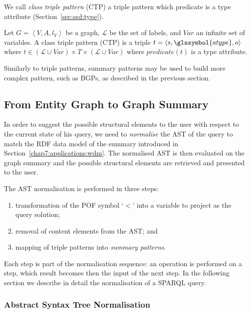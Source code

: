 We call \emph{class triple pattern} (CTP) a triple pattern which predicate is a type attribute (Section~\ref{sec:ssd:type}).

\begin{definition}
	Let $G=\left\langle V, A, l_V \right\rangle$ be a graph, $\mathcal{L}$ be the set of labels, and $Var$ an infinite set of variables.
	A class triple pattern (CTP) is a triple $t= \langle s, \glssymbol{atype}, o \rangle$ where $t \in (\mathcal{L} \cup Var) \times T \times (\mathcal{L} \cup Var)$ where $predicate(t)$ is a type attribute.
	\label{def:class-triple-pattern}
\end{definition}

Similarly to triple patterns, summary patterns may be used to build more complex pattern, such as BGPs, as described in the previous section.

\subsection{From Entity Graph to Graph Summary}

In order to suggest the possible structural elements to the user with respect to the current state of his query, we need to \emph{normalise} the AST of the query to match the RDF data model of the summary introduced in Section~\ref{chap7:applications:wdm}. The normalised AST is then evaluated on the graph summary and the possible structural elements are retrieved and presented to the user.

The AST normalisation is performed in three steps:
\begin{enumerate}
	\item transformation of the \gls{POF} symbol `$<$' into a variable to project as the query solution;
	\item removal of content elements from the AST; and
	\item mapping of triple patterns into \emph{summary patterns}.
\end{enumerate}
Each step is part of the normalisation sequence: an operation is performed on a step, which result becomes then the input of the next step.
In the following section we describe in detail the normalisation of a SPARQL query.

\subsubsection{Abstract Syntax Tree Normalisation}

